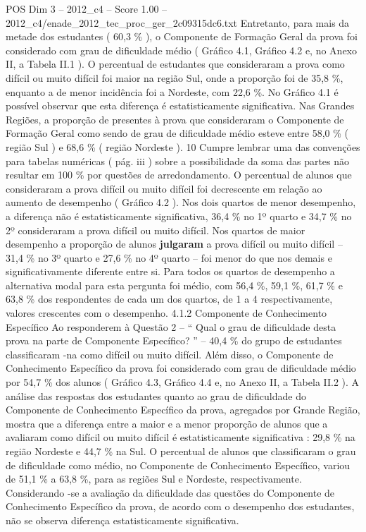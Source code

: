 \begin{textsample}{POS Dim 3 – 2012\_c4 – Score 1.00 – 2012\_c4/enade\_2012\_tec\_proc\_ger\_2c09315dc6.txt}
Entretanto, para mais da metade dos estudantes ( 60,3 \% ), o Componente de Formação Geral da prova foi considerado com grau de dificuldade médio ( Gráfico 4.1, Gráfico 4.2 e, no Anexo II, a Tabela II.1 ).
O percentual de estudantes que consideraram a prova como difícil ou muito difícil foi maior na região Sul, onde a proporção foi de 35,8 \%, enquanto a de menor incidência foi a Nordeste, com 22,6 \%.
No Gráfico 4.1 é possível observar que esta diferença é estatisticamente significativa.
Nas Grandes Regiões, a proporção de presentes à prova que consideraram o Componente de Formação Geral como sendo de grau de dificuldade médio esteve entre 58,0 \% ( região Sul ) e 68,6 \% ( região Nordeste ). 10 Cumpre lembrar uma das convenções para tabelas numéricas ( pág. iii ) sobre a possibilidade da soma das partes não resultar em 100 \% por questões de arredondamento.
O percentual de alunos que consideraram a prova difícil ou muito difícil foi decrescente em relação ao aumento de desempenho ( Gráfico 4.2 ).
Nos dois quartos de menor desempenho, a diferença não é estatisticamente significativa, 36,4 \% no 1º quarto e 34,7 \% no 2º consideraram a prova difícil ou muito difícil.
Nos quartos de maior desempenho a proporção de alunos \textbf{julgaram} a prova difícil ou muito difícil – 31,4 \% no 3º quarto e 27,6 \% no 4º quarto – foi menor do que nos demais e significativamente diferente entre si.
Para todos os quartos de desempenho a alternativa modal para esta pergunta foi médio, com 56,4 \%, 59,1 \%, 61,7 \% e 63,8 \% dos respondentes de cada um dos quartos, de 1 a 4 respectivamente, valores crescentes com o desempenho. 4.1.2 Componente de Conhecimento Específico Ao responderem à Questão 2 – “ Qual o grau de dificuldade desta prova na parte de Componente Específico? ” – 40,4 \% do grupo de estudantes classificaram -na como difícil ou muito difícil.
Além disso, o Componente de Conhecimento Específico da prova foi considerado com grau de dificuldade médio por 54,7 \% dos alunos ( Gráfico 4.3, Gráfico 4.4 e, no Anexo II, a Tabela II.2 ).
A análise das respostas dos estudantes quanto ao grau de dificuldade do Componente de Conhecimento Específico da prova, agregados por Grande Região, mostra que a diferença entre a maior e a menor proporção de alunos que a avaliaram como difícil ou muito difícil é estatisticamente significativa : 29,8 \% na região Nordeste e 44,7 \% na Sul.
O percentual de alunos que classificaram o grau de dificuldade como médio, no Componente de Conhecimento Específico, variou de 51,1 \% a 63,8 \%, para as regiões Sul e Nordeste, respectivamente.
Considerando -se a avaliação da dificuldade das questões do Componente de Conhecimento Específico da prova, de acordo com o desempenho dos estudantes, não se observa diferença estatisticamente significativa.

\end{textsample}
